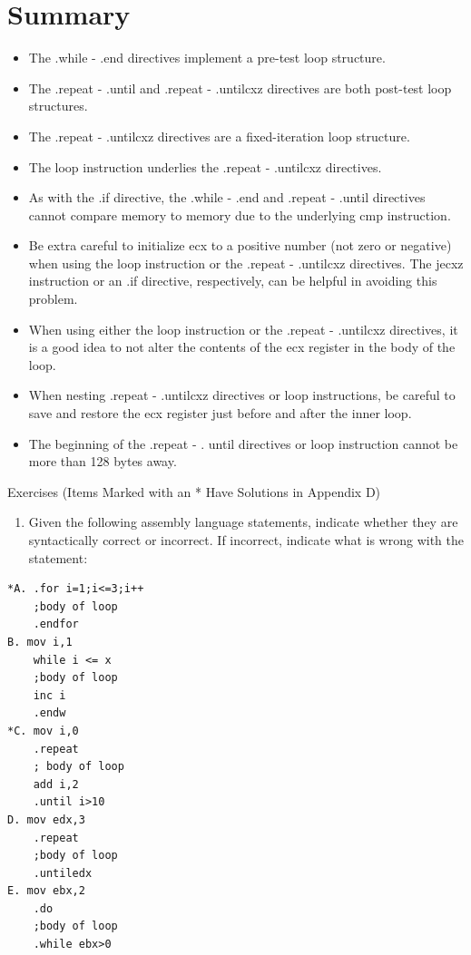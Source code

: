 \documentclass[10pt]{book}
\begin{document}
\section{Summary}
\begin{itemize}
  \item The .while - .end directives implement a pre-test loop structure.
  \item The .repeat - .until and .repeat - .untilcxz directives are both post-test loop structures.
  \item The .repeat - .untilcxz directives are a fixed-iteration loop structure.
  \item The loop instruction underlies the .repeat - .untilcxz directives.
  \item As with the .if directive, the .while - .end and .repeat - .until directives cannot compare memory to memory due to the underlying cmp instruction.
  \item Be extra careful to initialize ecx to a positive number (not zero or negative) when using the loop instruction or the .repeat - .untilcxz directives. The jecxz instruction or an .if directive, respectively, can be helpful in avoiding this problem.
  \item When using either the loop instruction or the .repeat - .untilcxz directives, it is a good idea to not alter the contents of the ecx register in the body of the loop.
  \item When nesting .repeat - .untilcxz directives or loop instructions, be careful to save and restore the ecx register just before and after the inner loop.
  \item The beginning of the .repeat - . until directives or loop instruction cannot be more than 128 bytes away.
\end{itemize}

Exercises (Items Marked with an * Have Solutions in Appendix D)
\begin{enumerate}
  \item Given the following assembly language statements, indicate whether they are syntactically correct or incorrect. If incorrect, indicate what is wrong with the statement:
\end{enumerate}

\begin{verbatim}
*A. .for i=1;i<=3;i++
    ;body of loop
    .endfor
B. mov i,1
    while i <= x
    ;body of loop
    inc i
    .endw
*C. mov i,0
    .repeat
    ; body of loop
    add i,2
    .until i>10
D. mov edx,3
    .repeat
    ;body of loop
    .untiledx
E. mov ebx,2
    .do
    ;body of loop
    .while ebx>0
\end{verbatim}
\end{document}
